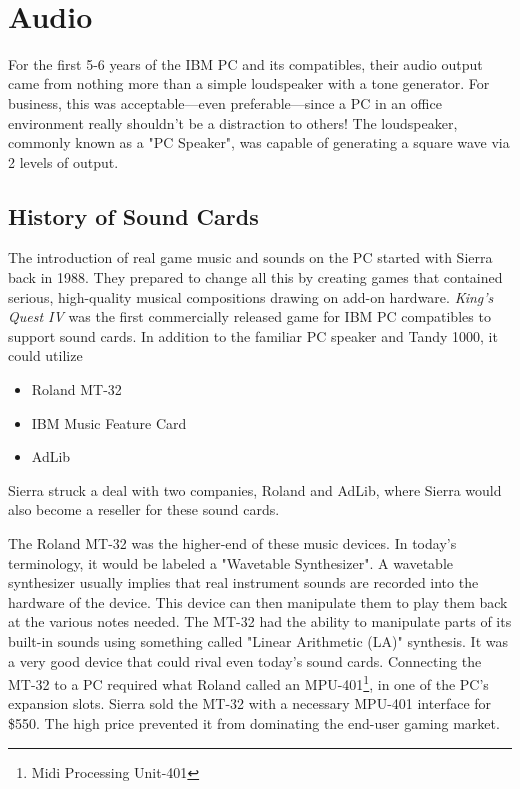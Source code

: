 \documentclass[book.tex]{subfiles}
\begin{document}
\\


\section{Audio}
\label{hardware-audio}
For the first 5-6 years of the IBM PC and its compatibles, their audio output came from nothing more than a simple loudspeaker with a tone generator. For business, this was acceptable---even preferable---since a PC in an office environment really shouldn't be a distraction to others! The loudspeaker, commonly known as a "PC Speaker", was capable of generating a square wave via 2 levels of output.\\
\begin{figure}[H]
\centering
{}
\end{figure}


\subsection{History of Sound Cards}
The introduction of real game music and sounds on the PC started with Sierra back in 1988. They prepared to change all this by creating games that contained serious, high-quality musical compositions drawing on add-on hardware. \textit{King's Quest IV} was the first commercially released game for IBM PC compatibles to support sound cards. In addition to the familiar PC speaker and Tandy 1000, it could utilize 
\begin{itemize}
    \item Roland MT-32
    \item IBM Music Feature Card
    \item AdLib
\end{itemize}
 
Sierra struck a deal with two companies, Roland and AdLib, where Sierra would also become a reseller for these sound cards. \\

\par
The Roland MT-32 was the higher-end of these music devices. In today's terminology, it would be labeled a "Wavetable Synthesizer". A wavetable synthesizer usually implies that real instrument sounds are recorded into the hardware of the device. This device can then manipulate them to play them back at the various notes needed. The MT-32 had the ability to manipulate parts of its built-in sounds using something called "Linear Arithmetic (LA)" synthesis. It was a very good device that could rival even today's sound cards. Connecting the MT-32 to a PC required what Roland called an MPU-401\footnote{Midi Processing Unit-401}, in one of the PC's expansion slots. Sierra sold the MT-32 with a necessary MPU-401 interface for \$550. The high price prevented it from dominating the end-user gaming market.\\
\end{document}
